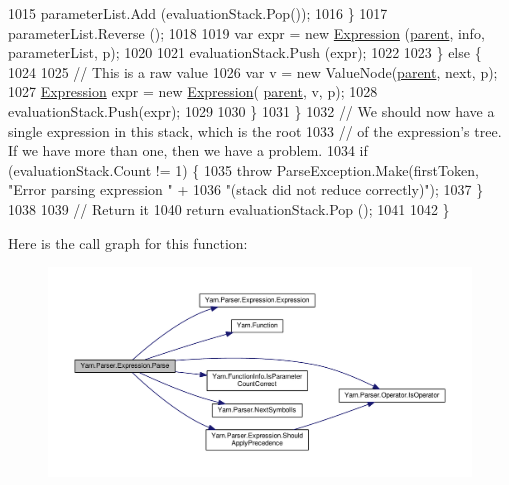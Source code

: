 \begin{DoxyCode}
1015                             parameterList.Add (evaluationStack.Pop());
1016                         \}
1017                         parameterList.Reverse ();
1018 
1019                         var expr = \textcolor{keyword}{new} \hyperlink{a00094_a17e5101d02b96d0071e7a0223e4daa3d}{Expression} (\hyperlink{a00138_af313a82103fcc2ff5a177dbb06b92f7b}{parent}, info, parameterList, p);
1020 
1021                         evaluationStack.Push (expr);
1022 
1023                     \} \textcolor{keywordflow}{else} \{
1024 
1025                         \textcolor{comment}{// This is a raw value}
1026                         var v = \textcolor{keyword}{new} ValueNode(\hyperlink{a00138_af313a82103fcc2ff5a177dbb06b92f7b}{parent}, next, p);
1027                         \hyperlink{a00094_a17e5101d02b96d0071e7a0223e4daa3d}{Expression} expr = \textcolor{keyword}{new} \hyperlink{a00094_a17e5101d02b96d0071e7a0223e4daa3d}{Expression}(
      \hyperlink{a00138_af313a82103fcc2ff5a177dbb06b92f7b}{parent}, v, p);
1028                         evaluationStack.Push(expr);
1029 
1030                     \}
1031                 \}
1032                 \textcolor{comment}{// We should now have a single expression in this stack, which is the root}
1033                 \textcolor{comment}{// of the expression's tree. If we have more than one, then we have a problem.}
1034                 \textcolor{keywordflow}{if} (evaluationStack.Count != 1) \{
1035                     \textcolor{keywordflow}{throw} ParseException.Make(firstToken, \textcolor{stringliteral}{"Error parsing expression "} +
1036                         \textcolor{stringliteral}{"(stack did not reduce correctly)"});
1037                 \}
1038 
1039                 \textcolor{comment}{// Return it}
1040                 \textcolor{keywordflow}{return} evaluationStack.Pop ();
1041 
1042             \}
\end{DoxyCode}


Here is the call graph for this function\-:
\nopagebreak
\begin{figure}[H]
\begin{center}
\leavevmode
\includegraphics[width=350pt]{a00094_a686da57aaf67d50d2832f9ee0028a979_cgraph}
\end{center}
\end{figure}


